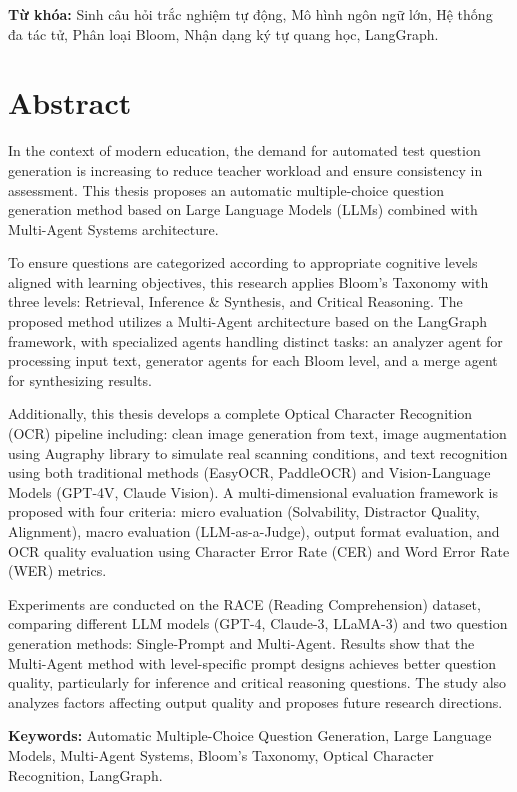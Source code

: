 \documentclass[12pt]{article}
\begin{document}
\textbf{Từ khóa:} Sinh câu hỏi trắc nghiệm tự động, Mô hình ngôn ngữ lớn, Hệ thống đa tác tử, Phân loại Bloom, Nhận dạng ký tự quang học, LangGraph.

\pagebreak

\section*{Abstract}

In the context of modern education, the demand for automated test question generation is increasing to reduce teacher workload and ensure consistency in assessment. This thesis proposes an automatic multiple-choice question generation method based on Large Language Models (LLMs) combined with Multi-Agent Systems architecture.

To ensure questions are categorized according to appropriate cognitive levels aligned with learning objectives, this research applies Bloom's Taxonomy with three levels: Retrieval, Inference \& Synthesis, and Critical Reasoning. The proposed method utilizes a Multi-Agent architecture based on the LangGraph framework, with specialized agents handling distinct tasks: an analyzer agent for processing input text, generator agents for each Bloom level, and a merge agent for synthesizing results.

Additionally, this thesis develops a complete Optical Character Recognition (OCR) pipeline including: clean image generation from text, image augmentation using Augraphy library to simulate real scanning conditions, and text recognition using both traditional methods (EasyOCR, PaddleOCR) and Vision-Language Models (GPT-4V, Claude Vision). A multi-dimensional evaluation framework is proposed with four criteria: micro evaluation (Solvability, Distractor Quality, Alignment), macro evaluation (LLM-as-a-Judge), output format evaluation, and OCR quality evaluation using Character Error Rate (CER) and Word Error Rate (WER) metrics.

Experiments are conducted on the RACE (Reading Comprehension) dataset, comparing different LLM models (GPT-4, Claude-3, LLaMA-3) and two question generation methods: Single-Prompt and Multi-Agent. Results show that the Multi-Agent method with level-specific prompt designs achieves better question quality, particularly for inference and critical reasoning questions. The study also analyzes factors affecting output quality and proposes future research directions.

\textbf{Keywords:} Automatic Multiple-Choice Question Generation, Large Language Models, Multi-Agent Systems, Bloom's Taxonomy, Optical Character Recognition, LangGraph.
\end{document}
